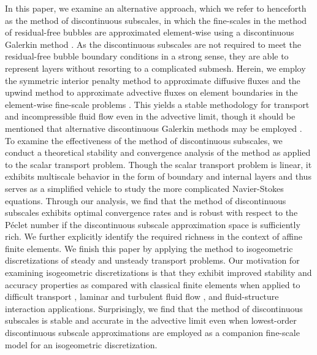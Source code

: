 \documentclass[11pt]{article}
\begin{document}
In this paper, we examine an alternative approach, which we refer to henceforth as the method of discontinuous subscales, in which the fine-scales in the method of residual-free bubbles are approximated element-wise using a discontinuous Galerkin method \cite{Arnold02}.  As the discontinuous subscales are not required to meet the residual-free bubble boundary conditions in a strong sense, they are able to represent layers without resorting to a complicated submesh.  Herein, we employ the symmetric interior penalty method to approximate diffusive fluxes and the upwind method to approximate advective fluxes on element boundaries in the element-wise fine-scale problems \cite{Arnold82,Shu2009}.  This yields a stable methodology for transport and incompressible fluid flow even in the advective limit, though it should be mentioned that alternative discontinuous Galerkin methods may be employed \cite{Cockburn98,Cockburn01,Nguyen09}.  To examine the effectiveness of the method of discontinuous subscales, we conduct a theoretical stability and convergence analysis of the method as applied to the scalar transport problem.  Though the scalar transport problem is linear, it exhibits multiscale behavior in the form of boundary and internal layers and thus serves as a simplified vehicle to study the more complicated Navier-Stokes equations.  Through our analysis, we find that the method of discontinuous subscales exhibits optimal convergence rates and is robust with respect to the P\'{e}clet number if the discontinuous subscale approximation space is sufficiently rich.  We further explicitly identify the required richness in the context of affine finite elements.  We finish this paper by applying the method to isogeometric discretizations \cite{Hughes05} of steady and unsteady transport problems.  Our motivation for examining isogeometric discretizations is that they exhibit improved stability and accuracy properties as compared with classical finite elements when applied to difficult transport \cite{Bazilevs06}, laminar and turbulent fluid flow \cite{Bazilevs07b,Evans13a,Evans13b,vanOpstal17}, and fluid-structure interaction \cite{Bazilevs08} applications.  Surprisingly, we find that the method of discontinuous subscales is stable and accurate in the advective limit even when lowest-order discontinuous subscale approximations are employed as a companion fine-scale model for an isogeometric discretization.  
\end{document}
